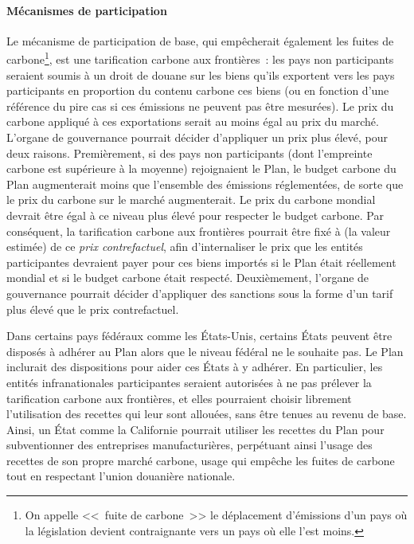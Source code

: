 \documentclass[a5paper,french]{memoir}
\begin{document}
\paragraph{Mécanismes de participation}

Le mécanisme de participation de base, qui empêcherait également les fuites de carbone\footnote{On appelle <<~fuite de carbone~>> le déplacement d'émissions d'un pays où la législation devient contraignante vers un pays où elle l'est moins.}, est une tarification carbone aux frontières~: les pays non participants seraient soumis à un droit de douane sur les biens qu'ils exportent vers les pays participants en proportion du contenu carbone ces biens (ou en fonction d'une référence du pire cas si ces émissions ne peuvent pas être mesurées). Le prix du carbone appliqué à ces exportations serait au moins égal au prix du marché. L'organe de gouvernance pourrait décider d'appliquer un prix plus élevé, pour deux raisons. Premièrement, si des pays non participants (dont l'empreinte carbone est supérieure à la moyenne) rejoignaient le Plan, le budget carbone du Plan augmenterait moins que l'ensemble des émissions réglementées, de sorte que le prix du carbone sur le marché augmenterait. Le prix du carbone mondial devrait être égal à ce niveau plus élevé pour respecter le budget carbone. Par conséquent, la tarification carbone aux frontières pourrait être fixé à (la valeur estimée) de ce \textit{prix contrefactuel}, afin d'internaliser le prix que les entités participantes devraient payer pour ces biens importés si le Plan était réellement mondial et si le budget carbone était respecté. Deuxièmement, l'organe de gouvernance pourrait décider d'appliquer des sanctions sous la forme d'un tarif plus élevé que le prix contrefactuel. 

Dans certains pays fédéraux comme les États-Unis, certains États peuvent être disposés à adhérer au Plan alors que le niveau fédéral ne le souhaite pas. Le Plan inclurait des dispositions pour aider ces États à y adhérer. En particulier, les entités infranationales participantes seraient autorisées à ne pas prélever la tarification carbone aux frontières, et elles pourraient choisir librement l'utilisation des recettes qui leur sont allouées, sans être tenues au revenu de base. 
Ainsi, un État comme la Californie pourrait utiliser les recettes du Plan pour subventionner des entreprises manufacturières, perpétuant ainsi l'usage des recettes de son propre marché carbone, usage qui empêche les fuites de carbone tout en respectant l'union douanière nationale.
\end{document}
